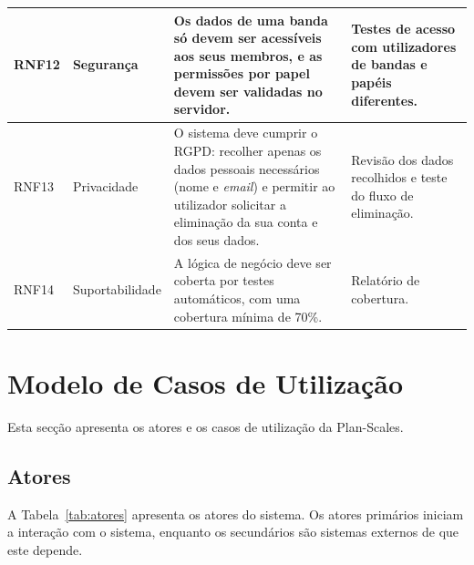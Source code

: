 \begin{longtable}{|p{1.5cm}|p{2.4cm}|p{6.4cm}|p{3.7cm}|}
RNF12 & Segurança & Os dados de uma banda só devem ser acessíveis aos seus membros, e as permissões por papel devem ser validadas no servidor. & Testes de acesso com utilizadores de bandas e papéis diferentes. \\ \hline
RNF13 & Privacidade & O sistema deve cumprir o RGPD: recolher apenas os dados pessoais necessários (nome e \textit{email}) e permitir ao utilizador solicitar a eliminação da sua conta e dos seus dados. & Revisão dos dados recolhidos e teste do fluxo de eliminação. \\ \hline
RNF14 & Suportabilidade & A lógica de negócio deve ser coberta por testes automáticos, com uma cobertura mínima de 70\%. & Relatório de cobertura. \\ \hline
\end{longtable}
\pagebreak


\section{Modelo de Casos de Utilização}
\label{sec:casos-utilizacao}
Esta secção apresenta os atores e os casos de utilização da Plan-Scales.

\subsection{Atores}
A Tabela~\ref{tab:atores} apresenta os atores do sistema. Os atores primários iniciam a interação com o sistema, enquanto os secundários são sistemas externos de que este depende.

